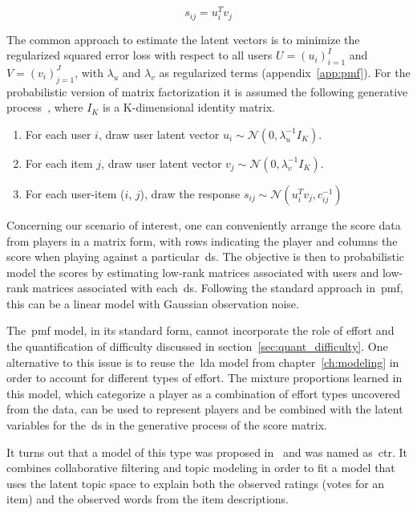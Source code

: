 \begin{equation}
    s_{ij} = u_{i}^{T}v_{j}
\end{equation}

The common approach to estimate the latent vectors is to minimize the regularized squared error loss with respect to all users $U=(u_{i})_{i=1}^{I}$ and $V=(v_{i})_{j=1}^{J}$, with $\lambda_{u}$ and $\lambda_{v}$ as regularized terms (appendix~\ref{app:pmf}). For the probabilistic version of matrix factorization it is assumed the following generative process~\citep{wang_collaborative_2011}, where $I_{K}$ is a K-dimensional identity matrix.

\begin{enumerate}
    \item For each user $i$, draw user latent vector $u_{i} \sim \mathcal{N}(0,\lambda_{u}^{-1}I_{K})$.
    \item For each item $j$, draw user latent vector $v_{j} \sim \mathcal{N}(0,\lambda_{v}^{-1}I_{K})$.
    \item For each user-item ($i$, $j$), draw the response $s_{ij} \sim \mathcal{N}(u_{i}^{T}v_{j}, c_{ij}^{-1})$
\end{enumerate}


Concerning our scenario of interest, one can conveniently arrange the score data from players in a matrix form, with rows indicating the player and columns the score when playing against a particular~\gls{ds}. The objective is then to probabilistic model the scores by estimating low-rank matrices associated with users and low-rank matrices associated with each~\gls{ds}. %
Following the standard approach in~\gls{pmf}, this can be a linear model with Gaussian observation noise. 

The~\gls{pmf} model, in its standard form, cannot incorporate the role of effort and the quantification of difficulty discussed in section~\ref{sec:quant_difficulty}. One alternative to this issue is to reuse the~\gls{lda} model from chapter~\ref{ch:modeling} in order to account for different types of effort. The mixture proportions learned in this model, which categorize a player as a combination of effort types uncovered from the data, can be used to represent players and be combined with the latent variables for the~\gls{ds} in the generative process of the score matrix.

It turns out that a model of this type was proposed in~\cite{wang_collaborative_2011} and was named as~\gls{ctr}. It combines collaborative filtering and topic modeling in order to fit a model that uses the latent topic space to explain both the observed ratings (votes for an item) and the observed words from the item descriptions. 

